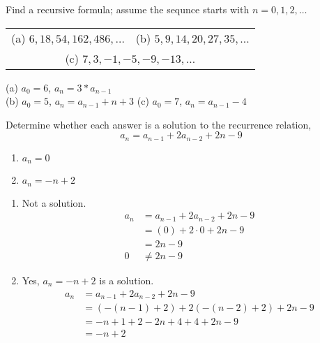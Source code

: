 \begin{questions}
 Find a recursive formula; assume the sequnce starts with $n=0,1,2,\ldots$

\begin{tabular}{ll}
    (a) $6, 18, 54, 162, 486, \ldots$  \hspace{0.3in}
        & (b) $5, 9, 14, 20, 27, 35, \ldots$\\
    \multicolumn{2}{c}{(c) $7, 3, -1, -5, -9, -13, \ldots$}
\end{tabular}
    \ifprintanswers
        \vspace{-10pt}
   \fi
\begin{solution}
    (a) $a_0 = 6$, $a_n = 3*a_{n-1}$ \\
    (b)  $a_0 = 5$, $a_n = a_{n-1} + n + 3$  
        \hspace{0.6in} (c) $a_0 = 7$, $a_n = a_{n-1} -4$
\end{solution}




 Determine whether each answer is a solution to the recurrence relation, 
$$ a_n = a_{n-1} + 2a_{n-2} + 2n - 9 $$
    \begin{enumerate}[label=(\alph*),topsep=0pt,itemsep=0pt,parsep=0pt]
        \item $a_n = 0$
        \item $a_n = -n +2$
    \end{enumerate}
    \ifprintanswers
        \vspace{-10pt}
    \fi
\begin{solution}
    \begin{enumerate}[label=(\alph*),topsep=0pt,itemsep=0pt,parsep=0pt]
        \item Not a solution.
        \begin{align*}
            a_n &= a_{n-1} + 2a_{n-2} + 2n - 9 \\
            &= (0) + 2\cdot0 + 2n - 9 \\
            &= 2n - 9 \\
            0 &\neq 2n - 9
        \end{align*}
        \item Yes, $a_n = -n + 2$ is a solution.
        \begin{align*}
            a_n &= a_{n-1} + 2a_{n-2} + 2n - 9 \\
            &= (-(n-1) + 2) + 2(-(n-2) + 2) + 2n -9 \\
            &= -n + 1 + 2 -2n + 4 + 4 + 2n -9 \\
            &= -n +2 \\
        \end{align*}
    \end{enumerate}
\end{solution}





\end{questions}
